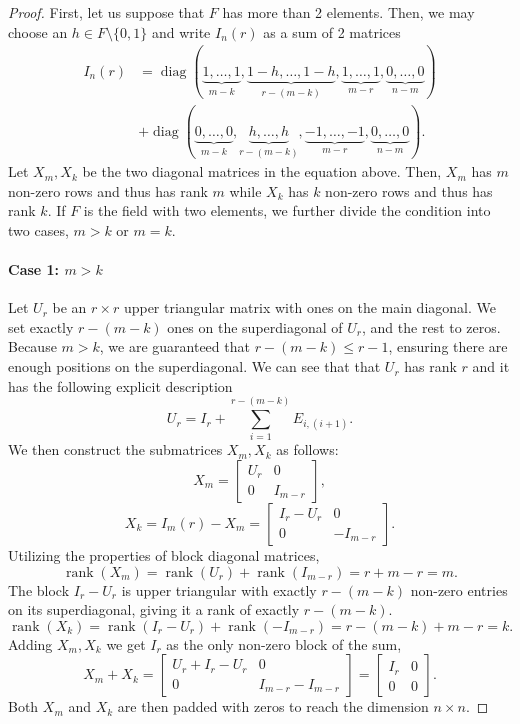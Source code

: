 \documentclass[12pt, a4paper]{amsart}
\theoremstyle{definition}
\numberwithin{equation}{section}
\DeclareMathOperator{\rank}{rank}
\DeclareMathOperator{\diag}{diag}
\begin{document}
\begin{proof}
    First, let us suppose that $F$ has more than 2 elements. Then, we may choose an $h \in F \setminus\{0,1\}$ and write $I_n(r)$ as a sum of 2 matrices
    \begin{align*}
        I_n(r)
        &= \diag(\underbrace{1,\ldots,1}_{m-k},\underbrace{1-h,\ldots,1-h}_{r-(m-k)},\underbrace{1,\ldots,1}_{m-r},\underbrace{0,\ldots,0}_{n-m})\\
        &+ \diag(\underbrace{0,\ldots,0}_{m-k},\underbrace{h,\ldots,h}_{r-(m-k)},\underbrace{-1,\ldots,-1}_{m-r},\underbrace{0,\ldots,0}_{n-m}).
    \end{align*}
    Let $X_m, X_k$ be the two diagonal matrices in the equation above. Then, $X_m$ has $m$ non-zero rows and thus has rank $m$ while $X_k$ has $k$ non-zero rows and thus has rank $k$.
    If $F$ is the field with two elements, we further divide the condition into two cases, $m>k$ or $m=k$.
    \paragraph{Case 1: $m>k$}
    Let $U_r$ be an $r\times r$ upper triangular matrix with ones on the main diagonal. We set exactly $r - (m-k)$ ones on the superdiagonal of $U_r$, and the rest to zeros. Because $m > k$, we are guaranteed that $r - (m-k) \le r-1$, ensuring there are enough positions on the superdiagonal. We can see that  that $U_r$ has rank $r$ and it has the following explicit description 
    \[U_r = I_r +\sum_{i=1}^{r - (m-k)} E_{i,(i+1)}.\]
    We then construct the submatrices $X_m,X_k$ as follows:
    \[
    X_m =
    \begin{bmatrix}
        U_r & 0\\
        0 & I_{m-r}
    \end{bmatrix},
    \]
    \[
    X_k = I_m(r) - X_m =
    \begin{bmatrix}
        I_r-U_r & 0\\
        0 & -I_{m-r}
    \end{bmatrix}.
    \]
    Utilizing the properties of block diagonal matrices,
    \[\rank(X_m) = \rank(U_r) + \rank(I_{m-r}) = r+m-r=m.\]
    The block $I_r - U_r$ is  upper triangular with exactly $r - (m-k)$ non-zero entries on its superdiagonal, giving it a rank of exactly $r - (m-k)$. 
    \[\rank(X_k) = \rank(I_r - U_r) + \rank(-I_{m-r}) = r - (m-k)+m-r=k.\]
    Adding $X_m,X_k$ we get $I_r$ as the only non-zero block of the sum,
    \[
    X_m + X_k =
    \begin{bmatrix}
        U_r + I_r - U_r & 0\\
        0 & I_{m-r} - I_{m-r}
    \end{bmatrix}
    =
    \begin{bmatrix}
        I_r& 0\\
        0 & 0
    \end{bmatrix}.
    \]
    Both $X_m$ and $X_k$ are then padded with zeros to reach the dimension $n\times n$.


\end{proof}
\end{document}
